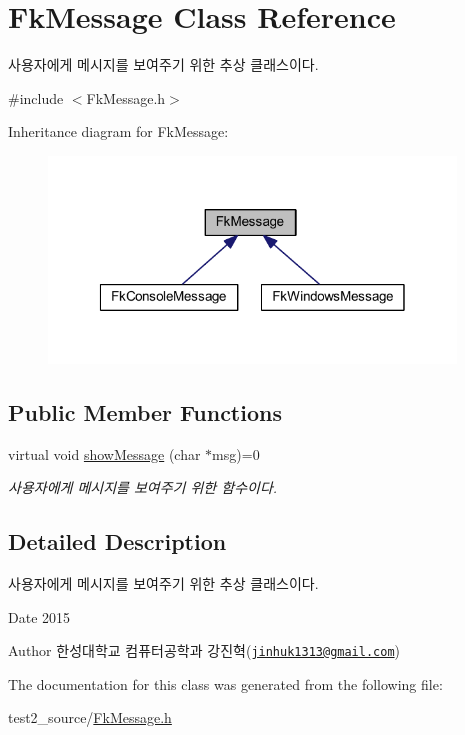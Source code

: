 \hypertarget{class_fk_message}{}\section{Fk\+Message Class Reference}
\label{class_fk_message}


사용자에게 메시지를 보여주기 위한 추상 클래스이다.  




{\ttfamily \#include $<$Fk\+Message.\+h$>$}



Inheritance diagram for Fk\+Message\+:\nopagebreak
\begin{figure}[H]
\begin{center}
\leavevmode
\includegraphics[width=307pt]{class_fk_message__inherit__graph}
\end{center}
\end{figure}
\subsection*{Public Member Functions}
\begin{DoxyCompactItemize}
\item 
\hypertarget{class_fk_message_ac6504c23d90dcd75d62355eac3bbd4d3}{}virtual void \hyperlink{class_fk_message_ac6504c23d90dcd75d62355eac3bbd4d3}{show\+Message} (char $\ast$msg)=0\label{class_fk_message_ac6504c23d90dcd75d62355eac3bbd4d3}

\begin{DoxyCompactList}\small\item\em 사용자에게 메시지를 보여주기 위한 함수이다. \end{DoxyCompactList}\end{DoxyCompactItemize}


\subsection{Detailed Description}
사용자에게 메시지를 보여주기 위한 추상 클래스이다. 

\begin{DoxyDate}{Date}
2015 
\end{DoxyDate}
\begin{DoxyAuthor}{Author}
한성대학교 컴퓨터공학과 강진혁(\href{mailto:jinhuk1313@gmail.com}{\tt jinhuk1313@gmail.\+com}) 
\end{DoxyAuthor}


The documentation for this class was generated from the following file\+:\begin{DoxyCompactItemize}
\item 
test2\+\_\+source/\hyperlink{_fk_message_8h}{Fk\+Message.\+h}\end{DoxyCompactItemize}
